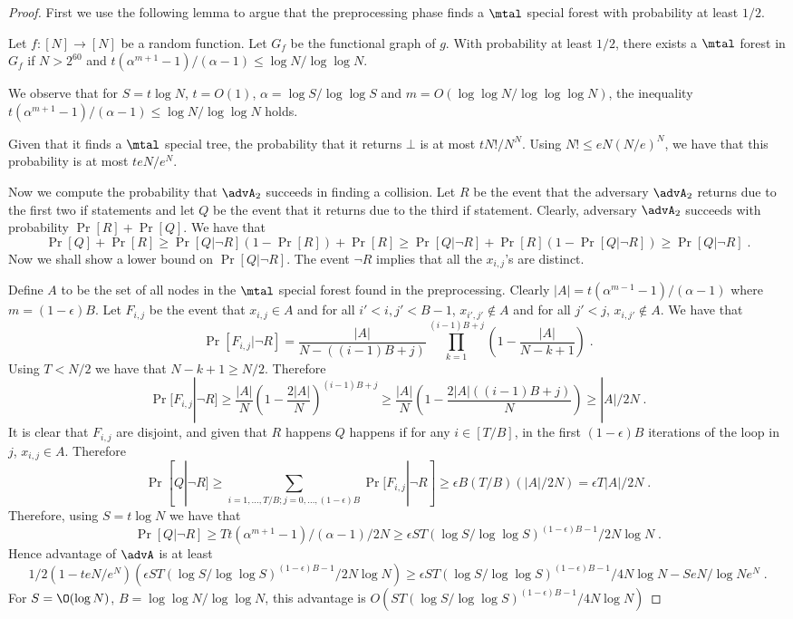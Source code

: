 \begin{proof}
    First we use the following lemma to argue that the preprocessing phase finds a $\mtal$ special forest with probability at least $1/2$. 

    \begin{lemma}\label{lem:comb}
        Let $f:[N]\to [N]$ be a random function. Let $G_f$ be the functional graph of $g$. With probability at least $1/2$, there exists a $\mtal$ forest in $G_f$ if $N>2^{60}$ and $t(\alpha^{m+1}-1)/(\alpha-1)\leq \log N/\log \log N$.
        \end{lemma}

        We observe that for $S=t\log N$, $t=O(1)$, $\alpha=\log S/\log \log S$ and $m=O(\log \log N/\log \log \log N)$, the inequality $t(\alpha^{m+1}-1)/(\alpha-1)\leq \log N/\log \log N$ holds.


    Given that it finds a $\mtal$ special tree, the probability that it returns $\bot$ is at most $tN!/N^N$. Using $N!\leq eN(N/e)^N$, we have that this probability is at most $teN/e^N$. 

Now we compute the probability that $\advA_2$ succeeds in finding a collision. Let $R$ be the event that the adversary $\advA_2$ returns due to the first two if statements and let $Q$ be the event that it returns due to the third if statement. Clearly, adversary $\advA_2$ succeeds with probability $\Pr[R]+\Pr[Q]$.
We have that 
\[
\Pr[Q]+\Pr[R]\geq \Pr[Q|\neg R](1-\Pr[R])+\Pr[R]\geq \Pr[Q|\neg R]+\Pr[R](1-\Pr[Q|\neg R])\geq \Pr[Q|\neg R]\;.
\]
Now we shall show a lower bound on $\Pr[Q|\neg R]$. The event $\neg R$ implies that all the $x_{i,j}$'s are distinct. 

Define $A$ to be the set of all nodes in the $\mtal$ special forest found in the preprocessing. Clearly $|A|=t(\alpha^{m-1}-1)/(\alpha-1)$ where $m=(1-\epsilon)B$. Let $F_{i,j}$ be the event that $x_{i,j}\in A$ and for all $i'<i,j'<B-1$, $x_{i',j'}\not\in A$ and for all $j'<j$, $x_{i,j'}\not\in A$. 
We have that 
\[
\Pr[F_{i,j}|\neg R]=\frac{|A|}{N-((i-1)B+j)}\prod_{k=1}^{(i-1)B+j}\left(1-\frac{|A|}{N-k+1}\right)\;.
\]
Using $T<N/2$ we have that $N-k+1\geq N/2$. Therefore
\[
\Pr[F_{i,j}|\neg R]\geq \frac{|A|}{N}\left(1-\frac{2|A|}{N}\right)^{(i-1)B+j}\geq \frac{|A|}{N}\left(1-\frac{2|A|((i-1)B+j)}{N}\right)\geq |A|/2N\;.
\]
It is clear that $F_{i,j}$ are disjoint, and given that $R$ happens $Q$ happens if for any $i\in [T/B]$, in the first $(1-\epsilon)B$ iterations of the loop in $j$, $x_{i,j}\in A$. Therefore
\[
    \Pr[Q|\neg R] \geq \sum_{i=1,\ldots, T/B; j=0,\ldots, (1-\epsilon)B}\Pr[F_{i,j}|\neg R]\geq  \epsilon B (T/B)(|A|/2N)=\epsilon T|A|/2N\;.
\]
Therefore, using $S=t\log N$ we have that 
\[
    \Pr[Q|\neg R]\geq Tt(\alpha^{m+1}-1)/(\alpha-1)/2N \geq  \epsilon ST{\left(\log S/\log \log S\right)}^{(1-\epsilon)B-1}/2N\log N\;.
\]
Hence advantage of $\advA$ is at least
\[
    1/2(1-teN/e^N)(\epsilon ST{\left(\log S/\log \log S\right)}^{(1-\epsilon)B-1}/2N\log N)\geq \epsilon ST{\left(\log S/\log \log S\right)}^{(1-\epsilon)B-1}/4N\log N -SeN/\log N e^N\;.
\]
For $S=\O(\log N)$, $B=\log \log N/\log \log N$, this advantage is $O(ST{\left(\log S/\log \log S\right)}^{(1-\epsilon)B-1}/4N\log N)$
\end{proof}
